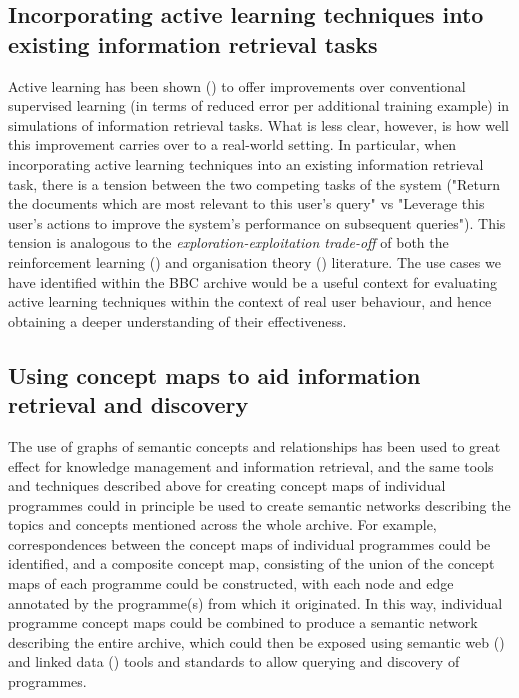 \documentclass[a4paper, 11pt]{article}
\begin{document}
\subsection{Incorporating active learning techniques into existing information retrieval tasks}

Active learning has been shown (\cite{Lewis1994}) to offer improvements over conventional supervised learning (in terms of reduced error per additional training example) in simulations of information retrieval tasks. What is less clear, however, is how well this improvement carries over to a real-world setting. In particular, when incorporating active learning techniques into an existing information retrieval task, there is a tension between the two competing tasks of the system  ("Return the documents which are most relevant to this user's query" vs "Leverage this user's actions to improve the system's performance on subsequent queries"). This tension is analogous to the \textit{exploration-exploitation trade-off} of both the reinforcement learning (\cite{Kaelbling1996}) and organisation theory (\cite{March1991}) literature. The use cases we have identified within the BBC archive would be a useful context for evaluating active learning techniques within the context of real user behaviour, and hence obtaining a deeper understanding of their effectiveness.

\subsection{Using concept maps to aid information retrieval and discovery}
The use of graphs of semantic concepts and relationships has been used to great effect for knowledge management and information retrieval, and the same tools and techniques described above for creating concept maps of individual programmes could in principle be used to create semantic networks describing the topics and concepts mentioned across the whole archive. For example, correspondences between the concept maps of individual programmes could be identified, and a composite concept map, consisting of the union of the concept maps of each programme could be constructed, with each node and edge annotated by the programme(s) from which it originated. In this way, individual programme concept maps could be combined to produce a semantic network describing the entire archive, which could then be exposed using semantic web (\cite{Berners-lee2002}) and linked data (\cite{Bizer2009}) tools and standards to allow querying and discovery of programmes.
\end{document}
